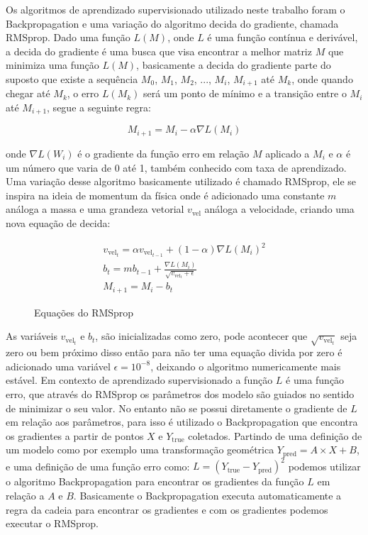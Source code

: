 Os algoritmos de aprendizado supervisionado utilizado neste trabalho
foram o Backpropagation e uma variação do algoritmo decida do gradiente, chamada
RMSprop.
Dado uma função $L(M)$, onde $L$ é uma função contínua e derivável,
a decida do gradiente é uma busca que visa encontrar
a melhor matriz $M$ que minimiza uma função $L(M)$, basicamente a
decida do gradiente parte do suposto que existe a sequência
$M_0$, $M_1$, $M_2$, ..., $M_i$, $M_{i+1}$ até $M_k$, onde quando
chegar até $M_k$, o erro $L(M_k)$ será um ponto de mínimo e a transição
entre o $M_{i}$ até $M_{i+1}$, segue a seguinte regra:

\begin{equation}
    M_{i+1} = M_i -\alpha \nabla L(M_i)
\end{equation}

onde $\nabla L(W_i)$ é o gradiente da função erro em relação $M$ aplicado
a $M_i$ e $\alpha$ é um número que varia de 0 até 1,
também conhecido com taxa de aprendizado. Uma variação desse algoritmo
basicamente utilizado é chamado RMSprop, ele se inspira na ideia de momentum
da física  onde  é adicionado uma constante $m$ análoga a massa e uma grandeza
vetorial $v_{\text{vel}}$ análoga a velocidade, criando uma nova equação de decida:

\begin{figure}[H]
    \begin{align*}
        v_{\text{vel}_t} = \alpha v_{\text{vel}_{t-1}} + (1 - \alpha)\nabla L(M_i)^2 \\
        b_t = mb_{t-1} + \frac{\nabla L(M_i)}{\sqrt{v_{\text{vel}_t} + \epsilon}} \\
        M_{i+1} = M_i - b_t
    \end{align*}
    \caption{Equações do RMSprop}
\end{figure}

As variáveis $v_{\text{vel}_t}$ e  $b_t$, são inicializadas como zero, pode acontecer
que  $\sqrt{v_{\text{vel}_t}}$ seja zero ou bem próximo disso então para não ter uma equação
divida por zero é adicionado uma variável $\epsilon =10^{-8}$, deixando o algoritmo numericamente
mais estável. Em contexto de aprendizado supervisionado a função $L$ é uma função erro, que 
através do RMSprop os parâmetros dos modelo são guiados no sentido de minimizar o seu valor.
No entanto não se possui diretamente o gradiente de $L$ em relação aos parâmetros, para isso
é utilizado o  Backpropagation que encontra os gradientes a partir
de pontos $X$ e $Y_{\text{true}}$ coletados. Partindo de  uma definição de um modelo como por exemplo uma
transformação geométrica $Y_{\text{pred}}= A \times X + B$, e uma definição de uma função
erro como: $L=(Y_{\text{true}}- Y_{\text{pred}})^2$ podemos utilizar o algoritmo
Backpropagation para encontrar os gradientes da função $L$ em relação a $A$
e  $B$. Basicamente o Backpropagation executa automaticamente a regra da cadeia
para encontrar os gradientes e com os gradientes podemos executar o RMSprop.

